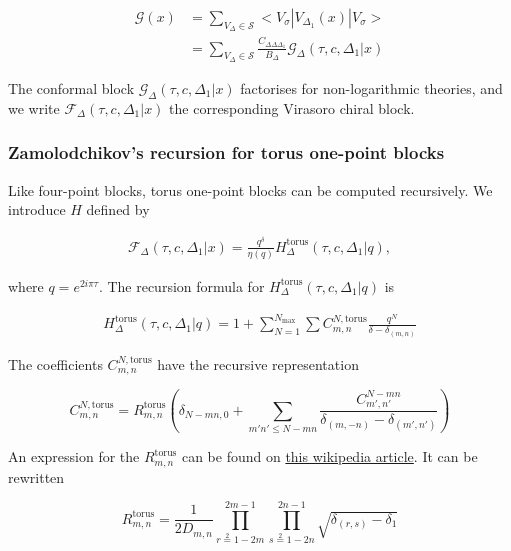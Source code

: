\documentclass[a4paper]{article}
\numberwithin{equation}{section}
\begin{document}
\begin{align}
  \mathcal G(x) &= \sum_{V_{\Delta} \in \mathcal S} < V_{\sigma} | V_{\Delta_{1}}(x) |V_{\sigma}> \\
                   &= \sum_{V_{\Delta} \in \mathcal S} \frac{C_{\Delta \Delta \Delta_{1}}}{B_{\Delta}} \mathcal G_{\Delta} (\tau, c, \Delta_{1} | x)
\end{align}

The conformal block \(\mathcal G_\Delta(\tau, c, \Delta_1|x)\) factorises for non-logarithmic theories, and we write \(\mathcal F_\Delta(\tau, c, \Delta_1 | x)\) the corresponding Virasoro chiral block.
\subsubsection*{Zamolodchikov's recursion for torus one-point blocks}
\label{sec:org59d6733}

Like four-point blocks, torus one-point blocks can be computed recursively. We introduce \(H\) defined by

\begin{align}
  \mathcal F_{\Delta}(\tau, c, \Delta_{1} | x) = \frac{q^{\delta}}{\eta(q)} H^{\text{torus}}_{\Delta}(\tau, c, \Delta_{1} | q),
\end{align}

where \(q=e^{2i\pi \tau}\).
The recursion formula for \(H^{\text{torus}}_{\Delta}(\tau, c, \Delta_{1} | q)\) is

\begin{align}
  H_{\Delta}^{\text{torus}} (\tau, c, \Delta_{1} | q) = 1 + \sum_{N=1}^{N_{\text{max}}}\sum C^{N, \text{torus}}_{m,n} \frac{q^N}{\delta - \delta_{(m,n)}}
\end{align}

The coefficients \(C_{m,n}^{N,\text{torus}}\) have the recursive representation

\begin{equation}
\label{CNmn-torus}
C^{N,\text{torus}}_{m,n} = R^{\text{torus}}_{m,n}\left(\delta_{N-mn,0} + \sum_{m'n'\leq N-mn} \frac{C^{N-mn}_{m',n'}}{\delta_{(m,-n)}-\delta_{(m',n')}} \right)
\end{equation}

An expression for the \(R_{m,n}^{\text{torus}}\) can be found on \href{https://en.wikipedia.org/wiki/Virasoro\_conformal\_block}{this wikipedia article}. It can be rewritten

\[
R_{m,n}^{\text{torus}} = \frac{1}{2 D_{m,n}} \prod_{r\overset2=1-2m}^{2m-1} \prod_{s\overset2=1-2n}^{2n-1} \sqrt{\delta_{(r,s)} - \delta_1}
\]
\end{document}
